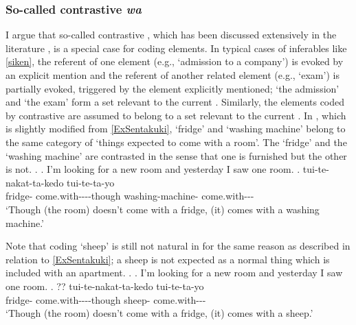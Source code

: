 \subsubsection{So-called contrastive \textit{wa}}


I argue that so-called contrastive ,
which has been discussed extensively in the literature \cite[e.g.,][]{kuno73},
is a special case for  coding  elements.
In typical cases of inferables like \ref{siken},
the referent of one element (e.g.,  `admission to a company') is evoked by an explicit mention and the referent of another related element (e.g.,  `exam') is partially evoked, triggered by the element explicitly mentioned;
`the admission' and `the exam' form a set relevant to the current .
Similarly, the elements coded by contrastive 
are assumed to belong to a set relevant to the current .
In \Next, which is slightly modified from \ref{ExSentakuki},
 `fridge' and  `washing machine' belong to the same category of `things expected to come with a room'.
The `fridge' and the `washing machine' are contrasted
in the sense that
one is furnished but the other is not.
%
\ex.
 \a. I'm looking for a new room and yesterday I saw one room.
 \bg.  tui-te-nakat-ta-kedo  tui-te-ta-yo \\
 	fridge- come.with----though washing-machine- come.with--- \\
	`Though (the room) doesn't come with a fridge, (it) comes with a washing machine.'

Note that  coding  `sheep' is still not natural in \Next
for the same reason as described in relation to \ref{ExSentakuki};
a sheep is not expected as a normal thing which is included with an apartment.
%
\ex.
 \a. I'm looking for a new room and yesterday I saw one room.
 \bg. ?? tui-te-nakat-ta-kedo  tui-te-ta-yo \\
 	fridge- come.with----though sheep- come.with--- \\
	`Though (the room) doesn't come with a fridge, (it) comes with a sheep.'


